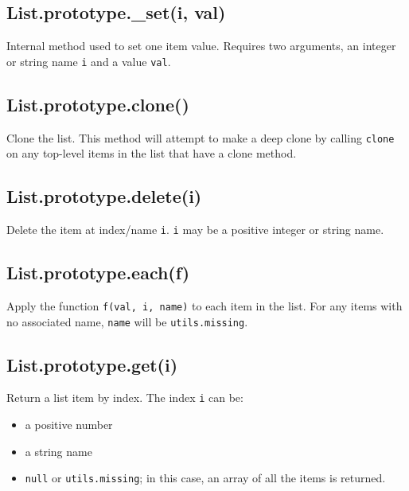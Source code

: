 \documentclass{article}
\begin{document}
    \subsection*{List.prototype.\_set(i, val)}
    Internal method used to set one item value. Requires two arguments,
an integer or string name \texttt{i} and a value \texttt{val}.


    \subsection*{List.prototype.clone()}
    Clone the list. This method will attempt to make a deep clone by calling \texttt{clone}
on any top-level items in the list that have a clone method.


    \subsection*{List.prototype.delete(i)}
    Delete the item at index/name \texttt{i}. \texttt{i} may be a positive integer or string name.


    \subsection*{List.prototype.each(f)}
    Apply the function \texttt{f(val, i, name)} to each item in the list.  For any
items with no associated name, \texttt{name} will be \texttt{utils.missing}.


    \subsection*{List.prototype.get(i)}
    Return a list item by index. The index \texttt{i} can be:


\begin{itemize}

\item a positive number

\item a string name

\item \texttt{null} or \texttt{utils.missing}; in this case, an array of all the items
is returned.

\end{itemize}
\end{document}
